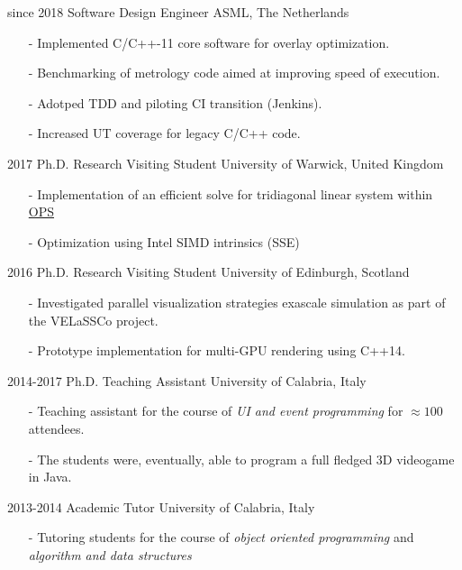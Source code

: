 \documentclass[]{twentysecondscv}
\begin{document}
\begin{twenty}
  \twentyitem
    {since 2018}
    {Software Design Engineer}
    {ASML, The Netherlands}
	{
		\vspace{-10pt}
		\begin{itemize}[leftmargin=*]
			\footnotesize
			\item[-] Implemented C/C++-11 core software for overlay optimization.
			\item[-] Benchmarking of metrology code aimed at improving speed of execution.
			\item[-] Adotped TDD and piloting CI transition (Jenkins).
			\item[-] Increased UT coverage for legacy C/C++ code.
		\end{itemize} 
	}
  \twentyitem
    {2017}
    {Ph.D. {\normalfont Research Visiting Student}}
    {University of Warwick, United Kingdom}
	{
		\vspace{-10pt}
		\begin{itemize}[leftmargin=*]
			\footnotesize
			\item[-] Implementation of an efficient solve for tridiagonal linear system within \href{https://github.com/OP-DSL/OPS}{OPS \faGithub}
			\item[-] Optimization using Intel SIMD intrinsics (SSE)
		\end{itemize} 
	}
  \twentyitem
    {2016}
    {Ph.D. {\normalfont Research Visiting Student}}
    {University of Edinburgh, Scotland}
	{
		\vspace{-10pt}
		\begin{itemize}[leftmargin=*]
			\footnotesize
			\item[-] Investigated parallel visualization strategies exascale simulation as part of the VELaSSCo project.
			\item[-] Prototype implementation for multi-GPU rendering using C++14.
		\end{itemize} 
	}
  \twentyitem
    {2014-2017}
    {Ph.D. {\normalfont Teaching Assistant}}
    {University of Calabria, Italy}
	{
		\vspace{-10pt}
		\begin{itemize}[leftmargin=*]
			\footnotesize
			\item[-] Teaching assistant for the course of \emph{UI and event programming} for $\approx 100$ attendees.
			\item[-] The students were, eventually, able to program a full fledged 3D videogame in Java. 
		\end{itemize} 
	}
  \twentyitem
    {2013-2014}
    {Academic Tutor}
    {University of Calabria, Italy}
    {
	    \vspace{-10pt}
	    \begin{itemize}[leftmargin=*]
	    	\footnotesize
	    	\item[-] Tutoring students for the course of \textit{object oriented programming} and \textit{algorithm and data structures}
	    \end{itemize} 
    }
\end{twenty}
\end{document}
